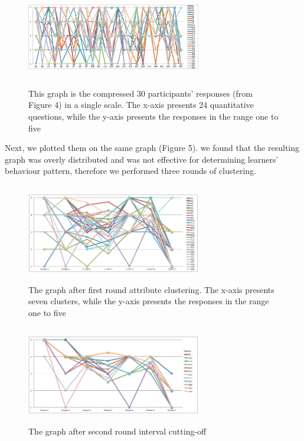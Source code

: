 \documentclass[a4paper,twoside]{article}
\begin{document}
\begin{figure}
\centering
\includegraphics[height=1.7in, width=3in]{fig5}
\caption{This graph is the compressed 30 participants' responses (from Figure 4) in a single scale. The x-axis presents 24 quantitative questions, while the y-axis presents the responses in the range one to five}
\end{figure}

Next, we plotted them on the same graph (Figure 5). we found that the resulting graph was overly distributed and was not effective for determining learners' behaviour pattern, therefore we performed three rounds of clustering. 

\begin{figure}
\centering
\includegraphics[height=1.7in, width=3in]{fig6}
\caption{The graph after first round attribute clustering. The x-axis presents seven clusters, while the y-axis presents the responses in the range one to five}
\end{figure}

\begin{figure}
\centering
\includegraphics[height=1.7in, width=3in]{fig7}
\caption{The graph after second round interval cutting-off}
\end{figure}
\end{document}
